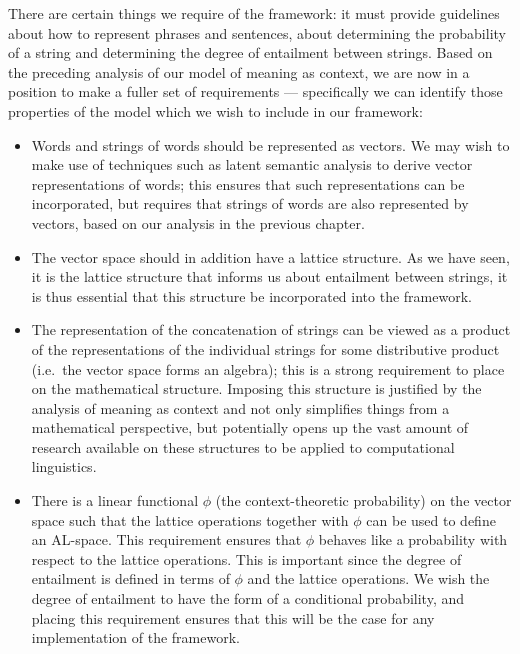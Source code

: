 There are certain things we require of the framework: it must provide guidelines about how to represent phrases and sentences, about determining the probability of a string and determining the degree of entailment between strings. Based on the preceding analysis of our model of meaning as context, we are now in a position to make a fuller set of requirements --- specifically we can identify those properties of the model which we wish to include in our framework:
\begin{itemize}
\item Words and strings of words should be represented as vectors. We may wish to make use of techniques such as latent semantic analysis to derive vector representations of words; this ensures that such representations can be incorporated, but requires that strings of words are also represented by vectors, based on our analysis in the previous chapter.
\item The vector space should in addition have a lattice structure. As we have seen, it is the lattice structure that informs us about entailment between strings, it is thus essential that this structure be incorporated into the framework.
\item The representation of the concatenation of strings can be viewed as a product of the representations of the individual strings for some distributive product (i.e.~the vector space forms an algebra); this is a strong requirement to place on the mathematical structure. Imposing this structure is justified by the analysis of meaning as context and not only simplifies things from a mathematical perspective, but potentially opens up the vast amount of research available on these structures to be applied to computational linguistics.
\item There is a linear functional $\phi$ (the context-theoretic probability) on the vector space such that the lattice operations together with $\phi$ can be used to define an AL-space. This requirement ensures that $\phi$ behaves like a probability with respect to the lattice operations. This is important since the degree of entailment is defined in terms of $\phi$ and the lattice operations. We wish the degree of entailment to have the form of a conditional probability, and placing this requirement ensures that this will be the case for any implementation of the framework.

\end{itemize}
